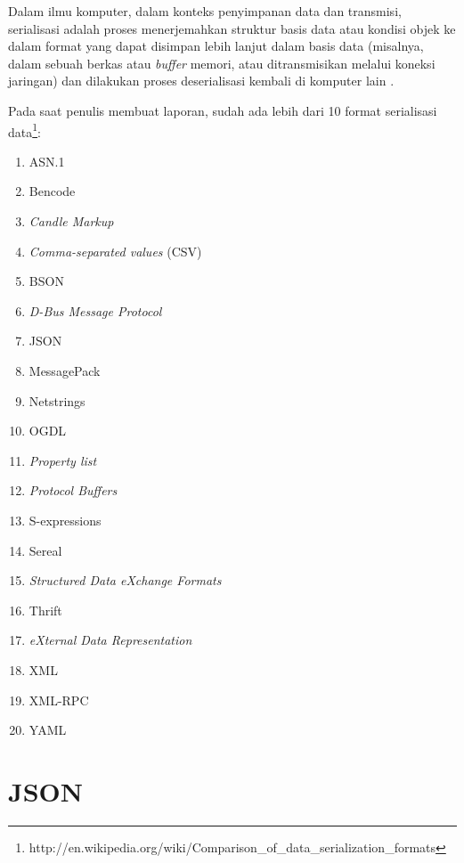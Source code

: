 \documentclass[a4paper, 12pt]{report}
\begin{document}
\onehalfspacing Dalam ilmu komputer, dalam konteks penyimpanan data dan transmisi, serialisasi adalah proses menerjemahkan struktur basis data atau kondisi objek ke dalam format yang dapat disimpan lebih lanjut dalam basis data (misalnya, dalam sebuah berkas atau \textit{buffer} memori, atau ditransmisikan melalui koneksi jaringan) dan dilakukan proses deserialisasi kembali di komputer lain \cite{serialization-wikipedia}.

\onehalfspacing Pada saat penulis membuat laporan, sudah ada lebih dari 10 format serialisasi data\footnote{http://en.wikipedia.org/wiki/Comparison\_of\_data\_serialization\_formats}:
\begin{enumerate}
  \item ASN.1
  \item Bencode
  \item \textit{Candle Markup}
  \item \textit{Comma-separated values} (CSV)
  \item BSON
  \item \textit{D-Bus Message Protocol}
  \item JSON
  \item MessagePack
  \item Netstrings
  \item OGDL
  \item \textit{Property list}
  \item \textit{Protocol Buffers}
  \item S-expressions
  \item Sereal
  \item \textit{Structured Data eXchange Formats}
  \item Thrift
  \item \textit{eXternal Data Representation}
  \item XML
  \item XML-RPC
  \item YAML
\end{enumerate}


\section{JSON}
\end{document}
